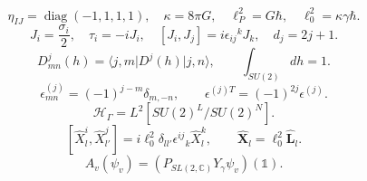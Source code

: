 \documentclass{article}
\newcommand{\ket}[1]{\lvert #1\rangle}
\newcommand{\bra}[1]{\langle #1\rvert}
\begin{document}
\begin{equation}
\eta_{IJ}=\operatorname{diag}(-1,1,1,1),\quad\kappa=8\pi G,\quad\ell_P^2=G\hbar,\quad\ell_0^2=\kappa\gamma\hbar.
\tag{C1}
\end{equation}
\begin{equation}
J_i=\frac{\sigma_i}{2},\quad\tau_i=-iJ_i,\quad[J_i,J_j]=i\epsilon_{ij}{}^kJ_k,\quad d_j=2j+1.
\tag{C2}
\end{equation}
\begin{equation}
D^j_{mn}(h)=\bra{j,m}D^j(h)\ket{j,n},\qquad\int_{SU(2)}dh=1.
\tag{C3}
\end{equation}
\begin{equation}
\epsilon^{(j)}_{mn}=(-1)^{j-m}\delta_{m,-n},\qquad\epsilon^{(j)T}=(-1)^{2j}\epsilon^{(j)}.
\tag{C4}
\end{equation}
\begin{equation}
\boxed{\mathcal H_\Gamma=L^2[SU(2)^L/SU(2)^N].}
\tag{T1}
\end{equation}
\begin{equation}
\boxed{[\hat X_l^i,\hat X_{l'}^j]=i\ell_0^2\delta_{ll'}\epsilon^{ij}{}_k\hat X_l^k,\qquad\hat{\mathbf X}_l=\ell_0^2\hat{\mathbf L}_l.}
\tag{T2}
\end{equation}
\begin{equation}
\boxed{A_v(\psi_v)=\left(P_{SL(2,\mathbb C)}Y_\gamma\psi_v\right)(\mathbb 1).}
\tag{T3}
\end{equation}
\end{document}
